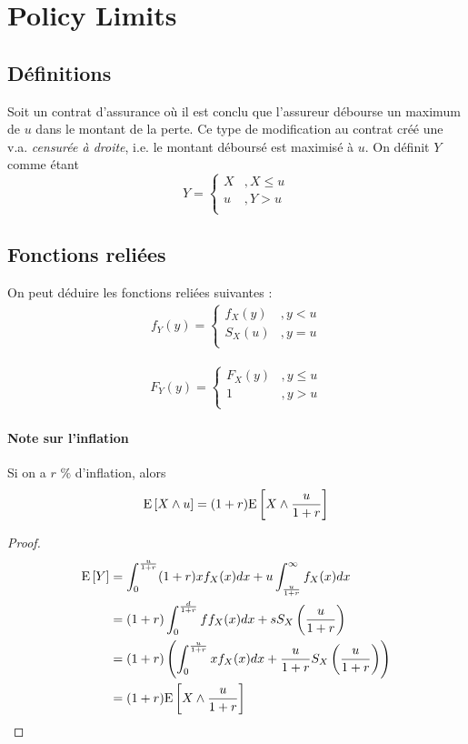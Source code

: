 \documentclass[12pt, french]{report}
\begin{document}
\section{Policy Limits}
\subsection{Définitions}
Soit un contrat d'assurance où il est conclu que l'assureur débourse un maximum de $u$ dans le montant de la perte. Ce type de modification au contrat créé une v.a. \textit{censurée à droite}, i.e. le montant déboursé est maximisé à $u$. On définit $Y$ comme étant
\begin{equation}
Y = 
\begin{cases}
X		& , X \leq u \\
u		& , Y > u \\
\end{cases}
\end{equation}

\subsection{Fonctions reliées}
On peut déduire les fonctions reliées suivantes : 
\begin{align*}
f_Y(y) = 
\begin{cases}
f_X(y)	& , y < u \\
S_X(u)	& , y = u \\
\end{cases}
\end{align*}

\begin{align*}
F_Y(y) =
\begin{cases}
F_X(y)	& , y \leq u \\
1	& , y > u \\
\end{cases}
\end{align*}

\paragraph{Note sur l'inflation} Si on a $r$ $\%$ d'inflation, alors
\begin{align*}
\mathrm{E} \left[ X \wedge u \right] = (1+r) \mathrm{E} \left[ X  \wedge \frac{u}{1+r} \right]
\end{align*}

\begin{proof}
\begin{align*}
\mathrm{E} \left[ Y \right]	& = \int_{0}^{\frac{u}{1+r}} (1+r) x f_X(x) dx  + u \int_{\frac{u}{1+r}}^{\infty} f_X(x) dx \\
	& = (1+r) \int_{0}^{\frac{d}{1+r}} f f_X(x) dx + s S_X \left( \frac{u}{1+r} \right) \\
	& = (1+r) \left( \int_{0}^{\frac{u}{1+r}} x f_X(x) dx  + \frac{u}{1+r} S_X \left( \frac{u}{1+r} \right)    \right)	 \\
	& = (1+r) \mathrm{E} \left[ X  \wedge \frac{u}{1+r} \right]  \\
\end{align*}
\end{proof}
\end{document}
